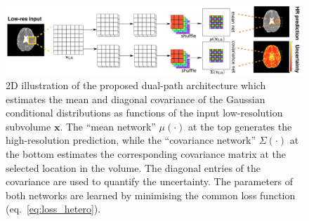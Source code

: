 \begin{figure}
	\includegraphics[width=\linewidth]{chapter_3/figures/fig_2_3.png}
	\centering	
	\caption{\footnotesize 2D illustration of the proposed dual-path architecture which estimates the mean and diagonal covariance of the Gaussian conditional distributions as functions of the input low-resolution subvolume $\mathbf{x}$.  The ``mean network'' $\mu(\cdot)$ at the top generates the high-resolution prediction, while the ``covariance network''  $\Sigma(\cdot)$ at the bottom estimates the corresponding covariance matrix at the selected location in the volume. The diagonal entries of the covariance are used to quantify the  uncertainty. The parameters of both networks are learned by minimising the common loss function (eq.~\eqref{eq:loss_hetero}).} 
	\label{fig:hetero}
\end{figure}

